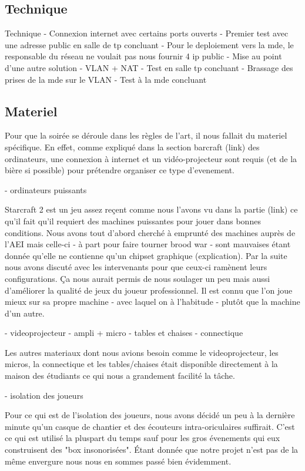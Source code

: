 \subsection{Technique}%
\label{sub:technique}

Technique
  - Connexion internet avec certains ports ouverts
  - Premier test avec une adresse public en salle de tp concluant
  - Pour le deploiement vers la mde, le responsable du réseau ne voulait pas nous fournir 4 ip public
  - Mise au point d'une autre solution
         - VLAN + NAT
  - Test en salle tp concluant
  - Brassage des prises de la mde sur le VLAN
  - Test à la mde concluant

\subsection{Materiel}%
\label{sub:materiel}

Pour que la soirée se déroule dans les règles de l'art, il nous fallait
du materiel spécifique. En effet, comme expliqué dans la section
barcraft (link) des ordinateurs, une connexion à internet et un
vidéo-projecteur sont requis (et de la bière si possible) pour prétendre
organiser ce type d'evenement.

- ordinateurs puissants

  Starcraft 2 est un jeu assez reçent comme nous l'avons vu dans la
partie (link) ce qu'il fait qu'il requiert des machines puissantes pour jouer
dans bonnes conditions. Nous avons tout d'abord cherché à emprunté des
machines auprès de l'AEI mais celle-ci - à part pour faire tourner brood
war - sont mauvaises étant donnée qu'elle ne contienne qu'un chipset
graphique (explication). Par la suite nous avons discuté avec les
intervenants pour que ceux-ci ramènent leurs configurations. Ça nous
aurait permis de nous soulager un peu mais aussi d'améliorer la qualité
de jeux du joueur professionnel. Il est connu que l'on joue mieux sur sa
propre machine - avec laquel on à l'habitude - plutôt que la machine d'un
autre.

- videoprojecteur
- ampli + micro
- tables et chaises
- connectique

Les autres materiaux dont nous avions besoin comme le videoprojecteur,
les micros, la connectique et les tables/chaises était disponible directement à
la maison des étudiants ce qui nous a grandement facilité la tâche.

- isolation des joueurs

Pour ce qui est de l'isolation des joueurs, nous avons décidé un peu à
la dernière minute qu'un casque de chantier et des écouteurs
intra-oriculaires suffirait. C'est ce qui est utilisé la pluspart du
temps sauf pour les gros évenements qui eux construisent des "box
insonorisées". Étant donnée que notre projet n'est pas de la même
envergure nous nous en sommes passé bien évidemment.

